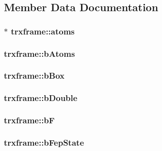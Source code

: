 \subsection{\-Member \-Data \-Documentation}
\hypertarget{structtrxframe_a1197dd6913bb66950885e8174b29fde7}{
\subsubsection[{atoms}]{ $\ast$ {\bf trxframe\-::atoms}}}\label{structtrxframe_a1197dd6913bb66950885e8174b29fde7}
\hypertarget{structtrxframe_ae8e5d44090ebe9d72a3e0e7159aa0bac}{
\subsubsection[{b\-Atoms}]{ {\bf trxframe\-::b\-Atoms}}}\label{structtrxframe_ae8e5d44090ebe9d72a3e0e7159aa0bac}
\hypertarget{structtrxframe_af5ba2a34f0a5dc515abad38f8ce17b52}{
\subsubsection[{b\-Box}]{ {\bf trxframe\-::b\-Box}}}\label{structtrxframe_af5ba2a34f0a5dc515abad38f8ce17b52}
\hypertarget{structtrxframe_afef04a728319b9efc01cd1e393f581c7}{
\subsubsection[{b\-Double}]{ {\bf trxframe\-::b\-Double}}}\label{structtrxframe_afef04a728319b9efc01cd1e393f581c7}
\hypertarget{structtrxframe_af0d0da08b672bb032c9d482e664a48eb}{
\subsubsection[{b\-F}]{ {\bf trxframe\-::b\-F}}}\label{structtrxframe_af0d0da08b672bb032c9d482e664a48eb}
\hypertarget{structtrxframe_a00a885964a66025484022a45a502f973}{
\subsubsection[{b\-Fep\-State}]{ {\bf trxframe\-::b\-Fep\-State}}}\label{structtrxframe_a00a885964a66025484022a45a502f973}
